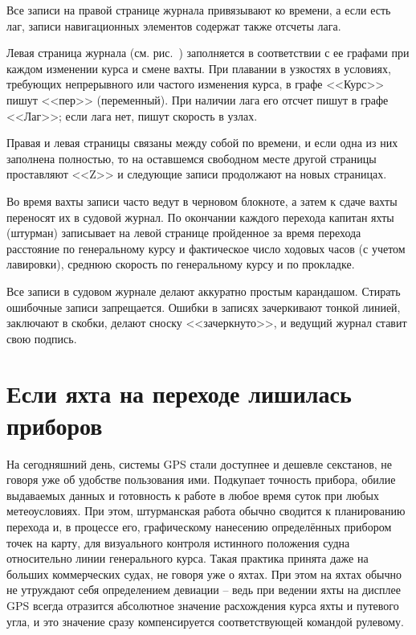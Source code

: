 Все записи на правой странице журнала привязывают ко времени, а если
есть лаг, записи навигационных элементов содержат также отсчеты лага.

Левая страница журнала (см. рис.~) заполняется в
соответствии с ее графами при каждом изменении курса и смене
вахты. При плавании в узкостях в условиях, требующих непрерывного или
частого изменения курса, в графе <<Курс>> пишут <<пер>>
(переменный). При наличии лага его отсчет пишут в графе <<Лаг>>; если
лага нет, пишут скорость в узлах.

Правая и левая страницы связаны между собой по времени, и если одна из
них заполнена полностью, то на оставшемся свободном месте другой
страницы проставляют <<Z>> и следующие записи продолжают на новых
страницах.

Во время вахты записи часто ведут в черновом блокноте, а затем к сдаче
вахты переносят их в судовой журнал. По окончании каждого перехода
капитан яхты (штурман) записывает на левой странице пройденное за
время перехода расстояние по генеральному курсу и фактическое число
ходовых часов (с учетом лавировки), среднюю скорость по генеральному
курсу и по прокладке.

Все записи в судовом журнале делают аккуратно простым
карандашом. Стирать ошибочные записи запрещается. Ошибки в записях
зачеркивают тонкой линией, заключают в скобки, делают сноску
<<зачеркнуто>>, и ведущий журнал ставит свою подпись.

\section{Если яхта на переходе лишилась приборов}

На сегодняшний день, системы GPS стали доступнее и дешевле секстанов,
не говоря уже об удобстве пользования ими. Подкупает точность прибора,
обилие выдаваемых данных и готовность к работе в любое время суток при
любых метеоусловиях. При этом, штурманская работа обычно сводится к
планированию перехода и, в процессе его, графическому нанесению
определённых прибором точек на карту, для визуального контроля
истинного положения судна относительно линии генерального курса. Такая
практика принята даже на больших коммерческих судах, не говоря уже о
яхтах. При этом на яхтах обычно не утруждают себя определением
девиации \--- ведь при ведении яхты на дисплее GPS всегда отразится
абсолютное значение расхождения курса яхты и путевого угла, и это
значение сразу компенсируется соответствующей командой рулевому.

